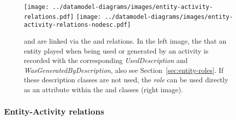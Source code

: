 

\begin{figure}[h]
\centering
\texttt{[image: ../datamodel-diagrams/images/entity-activity-relations.pdf]}
\hspace{0.15\textwidth}
\texttt{[image: ../datamodel-diagrams/images/entity-activity-relations-nodesc.pdf]}
\caption[- relations]{ and  are linked via the  and  relations. In the left image, the  that an entity played when being used or generated by an activity is recorded with the corresponding \emph{UsedDescription} and \emph{WasGeneratedByDescription}, also see Section~\ref{sec:entity-roles}. If these description classes are not used, the \emph{role} can be used directly as an attribute within the  and  classes (right image).}
\label{fig:entity-activity-relations}
\end{figure}


\subsubsection{Entity-Activity relations}\label{sec:entity-activity-relations}

